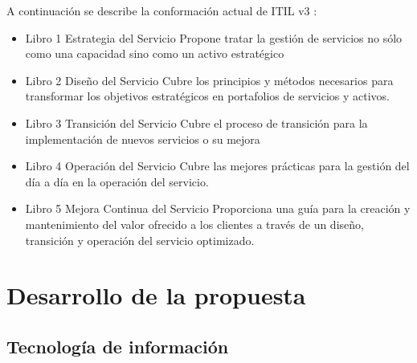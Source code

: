 \documentclass[preprint,12pt]{elsarticle}
\begin{document}
A continuación se describe la conformación actual de ITIL v3 :
\begin{itemize}
\item Libro 1  Estrategia del Servicio 
Propone tratar la gestión de servicios no sólo como una capacidad sino como un activo estratégico
\item Libro 2 Diseño del Servicio
Cubre los principios y métodos necesarios para transformar los objetivos estratégicos en portafolios de servicios y activos.
\item Libro 3 Transición del Servicio
Cubre el proceso de transición para la implementación de nuevos servicios o su mejora
\item Libro 4 Operación del Servicio
Cubre las mejores prácticas para la gestión del día a día en la operación del servicio.
\item Libro 5 Mejora Continua del Servicio
Proporciona una guía para la creación y mantenimiento del valor ofrecido a los clientes a través de un diseño, transición y operación del servicio optimizado.
\end{itemize}
\cite{Rios2007}
 



\section{Desarrollo de la propuesta}


\subsection{\textbf{Tecnología de información}}
\end{document}
